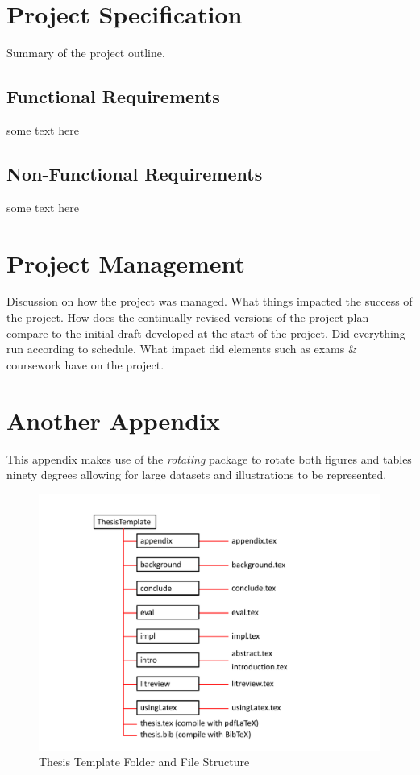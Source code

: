 \chapter{Project Specification}
Summary of the project outline.

\section{Functional Requirements}
some text here

\section{Non-Functional Requirements}
some text here

\chapter{Project Management}
Discussion on how the project was managed. What things impacted the success of the project. How does the continually revised versions of the project plan compare to the initial draft developed at the start of the project. Did everything run according to schedule. What impact did elements such as exams \& coursework have on the project. 

\chapter{Another Appendix}

This appendix makes use of the \emph{rotating} package to rotate both figures and tables ninety degrees allowing for large datasets and illustrations to be represented.

\begin{figure}[H]
\centering
\includegraphics[width=.9\linewidth]{resources/TemplateStructure.pdf}
\caption{Thesis Template Folder and \latex File Structure}
\label{fig:append:TemplateStructure}
\end{figure}


